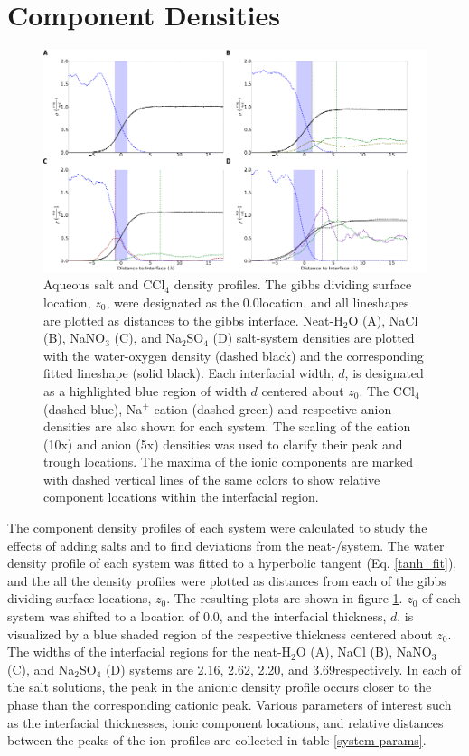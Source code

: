 \section{Component Densities}

\begin{figure}[h!]
\begin{center}
	\includegraphics[scale=1.0]{images/densities.png}
	\caption{Aqueous salt and CCl$_4$ density profiles. The gibbs dividing surface location, $z_0$, were designated as the 0.0\angs location, and all lineshapes are plotted as distances to the gibbs interface. Neat-H$_2$O (A), NaCl (B), NaNO$_3$ (C), and Na$_2$SO$_4$ (D) salt-system densities are plotted with the water-oxygen density (dashed black) and the corresponding fitted lineshape (solid black). Each interfacial width, $d$, is designated as a highlighted blue region of width $d$ centered about $z_0$. The CCl$_4$ (dashed blue), Na$^+$ cation (dashed green) and respective anion densities are also shown for each system. The scaling of the cation (10x) and anion (5x) densities was used to clarify their peak and trough locations. The maxima of the ionic components are marked with dashed vertical lines of the same colors to show relative component locations within the interfacial region.}
	\label{fig:density-plots}
\end{center}
\end{figure}

The component density profiles of each system were calculated to study the effects of adding salts and to find deviations from the neat-\wat/\ctc system. The water density profile of each system was fitted to a hyperbolic tangent (Eq. \ref{tanh_fit}), and the all the density profiles were plotted as distances from each of the gibbs dividing surface locations, $z_0$. The resulting plots are shown in figure \ref{fig:density-plots}. $z_0$ of each system was shifted to a location of 0.0\angs, and the interfacial thickness, $d$, is visualized by a blue shaded region of the respective thickness centered about $z_0$. The widths of the interfacial regions for the neat-H$_2$O (A), NaCl (B), NaNO$_3$ (C), and Na$_2$SO$_4$ (D) systems are 2.16, 2.62, 2.20, and 3.69\angs respectively. In each of the salt solutions, the peak in the anionic density profile occurs closer to the \ctc phase than the corresponding cationic peak. Various parameters of interest such as the interfacial thicknesses, ionic component locations, and relative distances between the peaks of the ion profiles are collected in table \ref{system-params}.

